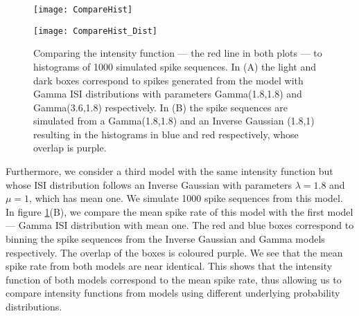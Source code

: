 \documentclass[../main.tex]{subfiles}
\begin{document}
     \begin{figure}[t]
    \begin{center}
	\begin{subfloat}{
	\texttt{[image: CompareHist]}}
	\end{subfloat}
	\begin{subfloat}{
	\texttt{[image: CompareHist\_Dist]}}
	\end{subfloat}	
		\caption{Comparing the intensity function --- the red line in both plots --- to histograms of 1000 simulated spike sequences. In (A) the light and dark boxes correspond to spikes generated from the model with Gamma ISI distributions with parameters Gamma(1.8,1.8) and Gamma(3.6,1.8) respectively. In (B) the spike sequences are simulated from a Gamma(1.8,1.8) and an Inverse Gaussian (1.8,1) resulting in the histograms in blue and red respectively, whose overlap is purple.  }
\label{fig:CompareHist}
\end{center}
\end{figure}


    
    
Furthermore, we consider a third model with the same intensity function but whose ISI distribution follows an Inverse Gaussian with parameters $\lambda=1.8$ and $\mu =1$, which has mean one. We simulate 1000 spike sequences from this model. In figure \ref{fig:CompareHist}(B), we compare the mean spike rate of this model with the first model ---  Gamma ISI distribution with mean one. The red and blue boxes correspond to binning the spike sequences from the Inverse Gaussian and Gamma models respectively. The overlap of the boxes is coloured purple. We see that the mean spike rate from both models are near identical. This shows that the intensity function of both models correspond to the mean spike rate, thus allowing us to compare intensity functions from models using different underlying probability distributions. 

\end{document}

